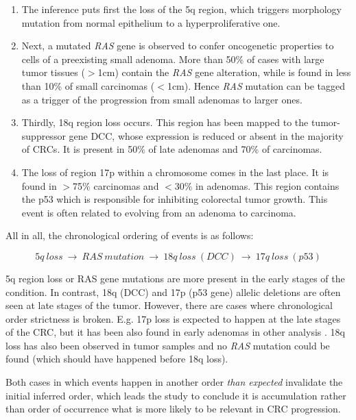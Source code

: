 \begin{enumerate}
    \item The inference puts first the loss of the 5q region, which triggers morphology mutation from normal epithelium to a hyperproliferative one.
    \item Next, a mutated \textit{RAS} gene is observed to confer oncogenetic properties to cells of a preexisting small adenoma. More than 50\% of cases with large tumor tissues ($>$1cm) contain the \textit{RAS} gene alteration, while is found in less than 10\% of small carcinomas ($<$1cm). Hence \textit{RAS}\´ mutation can be tagged as a trigger of the progression from small adenomas to larger ones.
    \item Thirdly, 18q region loss occurs. This region has been mapped to the tumor-suppressor gene DCC, whose expression is reduced or absent in the majority of CRCs. It is present in 50\% of late adenomas and 70\% of carcinomas.
    \item The loss of region 17p within a chromosome comes in the last place. It is found in $>$75\% carcinomas and $<$30\% in adenomas. This region contains the p53 which is responsible for inhibiting colorectal tumor growth. This event is often related to evolving from an adenoma to carcinoma.
\end{enumerate}

All in all, the chronological ordering of events is as follows:

\begin{equation}
5q\ loss\ \rightarrow\ \textit{RAS}\ mutation\ \rightarrow\ 18q\ loss\ (DCC)\ \rightarrow\ 17q\ loss\ (p53)    
\label{eq:crc}
\end{equation}

5q region loss or RAS gene mutations are more present in the early stages of the condition. In contrast, 18q (DCC) and 17p (p53 gene) allelic deletions are often seen at late stages of the tumor. However, there are cases where chronological order strictness is broken. E.g. 17p loss is expected to happen at the late stages of the CRC, but it has been also found in early adenomas in other analysis \cite{Diep2006TheChanges}. 18q loss has also been observed in tumor samples and no \textit{RAS} mutation could be found (which should have happened before 18q loss).

Both cases in which events happen in another order \textit{than expected} invalidate the initial inferred order, which leads the study to conclude it is accumulation rather than order of occurrence what is more likely to be relevant in CRC progression.

